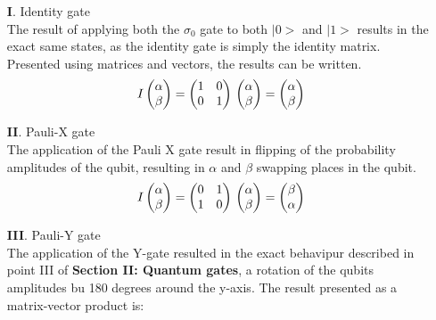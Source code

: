 \documentclass[onecolumn,10pt,cleanfoot]{asme2ej}
\begin{document}
		\begin{enumerate}
			\item[\textbf{I}. ] Identity gate \\
				The result of applying both the $\sigma_0$ gate to both $|0>$ and $|1>$ results in the exact same states, as the identity gate is simply the identity matrix. Presented using matrices and vectors, the results can be written.
				\[
				I \begin{pmatrix}
				\alpha \\
				\beta
				\end{pmatrix}
				=
				\begin{pmatrix}
				1 & 0 \\
				0 & 1
				\end{pmatrix} \\ \\ \\
				\begin{pmatrix}
				\alpha \\
				\beta
				\end{pmatrix}
				=
				\begin{pmatrix}
				\alpha \\
				\beta
				\end{pmatrix}
				\]
			\item[\textbf{II}. ] Pauli-X gate \\
				The application of the Pauli X gate result in flipping of the probability amplitudes of the qubit, resulting in $\alpha$ and $\beta$ swapping places in the qubit. 
				\[
				I \begin{pmatrix}
				\alpha \\
				\beta
				\end{pmatrix}
				=
				\begin{pmatrix}
				0 & 1 \\
				1 & 0
				\end{pmatrix} \\ \\ \\
				\begin{pmatrix}
				\alpha \\
				\beta
				\end{pmatrix}
				=
				\begin{pmatrix}
				\beta \\
				\alpha
				\end{pmatrix}
				\] 
			\item[\textbf{III}. ] Pauli-Y gate \\
				The application of the Y-gate resulted in the exact behavipur described in point III of \textbf{Section II: Quantum gates}, a rotation of the qubits amplitudes bu 180 degrees around the y-axis. The result presented as a matrix-vector product is: 

\end{enumerate}
\end{document}
